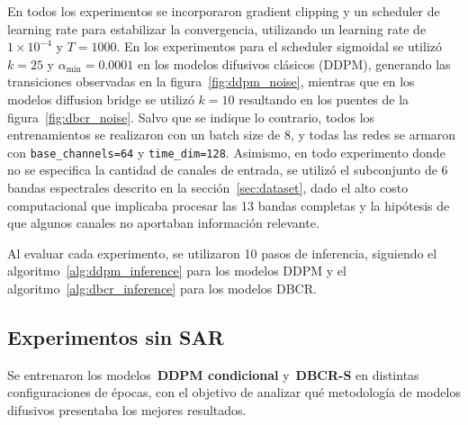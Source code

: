 








En todos los experimentos se incorporaron gradient clipping y un scheduler de learning rate para estabilizar la convergencia, utilizando un learning rate de $1\times10^{-4}$ y $T=1000$. En los experimentos para el scheduler sigmoidal se utilizó $k=25$ y $\alpha_{\min}=0.0001$ en los modelos difusivos clásicos (DDPM), generando las transiciones observadas en la figura~\ref{fig:ddpm_noise}, mientras que en los modelos diffusion bridge se utilizó $k=10$ resultando en los puentes de la figura~\ref{fig:dbcr_noise}. Salvo que se indique lo contrario, todos los entrenamientos se realizaron con un batch size de 8, y todas las redes se armaron con \texttt{base\_channels=64} y \texttt{time\_dim=128}. Asimismo, en todo experimento donde no se especifica la cantidad de canales de entrada, se utilizó el subconjunto de 6 bandas espectrales descrito en la sección~\ref{sec:dataset}, dado el alto costo computacional que implicaba procesar las 13 bandas completas y la hipótesis de que algunos canales no aportaban información relevante.

Al evaluar cada experimento, se utilizaron 10 pasos de inferencia, siguiendo el algoritmo~\ref{alg:ddpm_inference} para los modelos DDPM y el algoritmo~\ref{alg:dbcr_inference} para los modelos DBCR.

\subsection{Experimentos sin SAR}

Se entrenaron los modelos~\textbf{DDPM condicional} y~\textbf{DBCR-S} en distintas configuraciones de épocas, con el objetivo de analizar qué metodología de modelos difusivos presentaba los mejores resultados.

